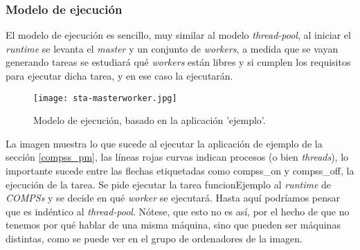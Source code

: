 \begin{comment}
\subsubsection{Compilación}

Para compilar la aplicacion en \textit{COMPSs} de \textit{C/C++}, 

\begin{figure}[H]
    \centering
    \caption{Proceso de compilado de una aplicación COMPSs C/C++}
    \texttt{[image: proceso\_compilado.jpg]}
    \label{fig:proceso_compilado}
\end{figure}
\end{comment}

\subsubsection{Modelo de ejecución\label{modeloejecucion}}

El modelo de ejecución es sencillo, muy similar al modelo \textit{thread-pool}, al iniciar el \textit{runtime} se levanta el \textit{master} y un conjunto de \textit{workers}, a medida que se vayan generando tareas se estudiará qué \textit{workers} están libres y si cumplen los requisitos para ejecutar dicha tarea, y en ese caso la ejecutarán. 

\begin{figure}[H]
    \centering 
    \caption{Modelo de ejecución, basado en la aplicación 'ejemplo'.}
    \texttt{[image: sta-masterworker.jpg]}
    \label{fig:masterworker_pool}
\end{figure}

La imagen muestra lo que sucede al ejecutar la aplicación de ejemplo de la sección \ref{compss_pm}, las líneas rojas curvas indican procesos (o bien \textit{threads}), lo importante sucede entre las flechas etiquetadas como compss\_on y compss\_off, la ejecución de la tarea. Se pide ejecutar la tarea funcionEjemplo al \textit{runtime} de \textit{COMPSs} y se decide en qué \textit{worker} se ejecutará. Hasta aquí podríamos pensar que es indéntico al \textit{thread-pool}. Nótese, que esto no es así, por el hecho de que no tenemos por qué hablar de una misma máquina, sino que pueden ser máquinas distintas, como se puede ver en el grupo de ordenadores de la imagen. 
\par\bigskip

